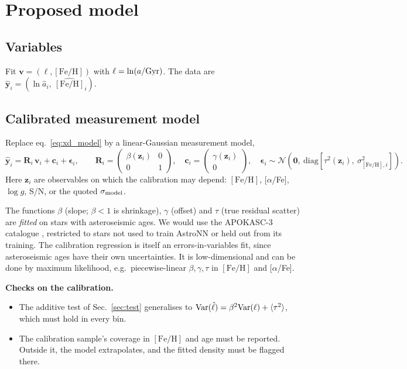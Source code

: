 \documentclass[11pt,a4paper]{article}
\newcommand{\feh}{\ensuremath{[\mathrm{Fe/H}]}}
\newcommand{\N}{\ensuremath{\mathcal{N}}}
\begin{document}
\section{Proposed model}
\label{sec:proposal}

\subsection{Variables}
Fit $\bm v=(\ell,\feh)$ with $\ell=\ln(a/{\rm Gyr})$. The data are $\hat{\bm y}_i=(\ln\hat a_i,\ \widehat{\feh}_i)$.

\subsection{Calibrated measurement model}
Replace eq.~\eqref{eq:xd_model} by a linear-Gaussian measurement model,
\begin{equation}
  \hat{\bm y}_i=\mathbf R_i\,\bm v_i+\bm c_i+\bm\epsilon_i,\qquad
  \mathbf R_i=\begin{pmatrix}\beta(\bm z_i)&0\\0&1\end{pmatrix},\quad
  \bm c_i=\begin{pmatrix}\gamma(\bm z_i)\\0\end{pmatrix},\quad
  \bm\epsilon_i\sim\N\!\left(\bm 0,\ \mathrm{diag}\!\left[\tau^2(\bm z_i),\ \sigma^2_{\feh,i}\right]\right).
  \label{eq:meas}
\end{equation}
Here $\bm z_i$ are observables on which the calibration may depend: \feh, [$\alpha$/Fe], $\log g$, S/N, or the quoted $\sigma_{\rm model}$.

The functions $\beta$ (slope; $\beta<1$ is shrinkage), $\gamma$ (offset) and $\tau$ (true residual scatter) are \emph{fitted} on stars with asteroseismic ages. We would use the APOKASC-3 catalogue \citep{Pinsonneault2025}, restricted to stars not used to train AstroNN or held out from its training. The calibration regression is itself an errors-in-variables fit, since asteroseismic ages have their own uncertainties. It is low-dimensional and can be done by maximum likelihood, e.g.\ piecewise-linear $\beta,\gamma,\tau$ in \feh{} and [$\alpha$/Fe].

\textbf{Checks on the calibration.}
\begin{itemize}
  \item The additive test of Sec.~\ref{sec:test} generalises to ${\rm Var}(\hat\ell)=\beta^2{\rm Var}(\ell)+\langle\tau^2\rangle$, which must hold in every bin.
  \item The calibration sample's coverage in \feh{} and age must be reported. Outside it, the model extrapolates, and the fitted density must be flagged there.
\end{itemize}
\end{document}
